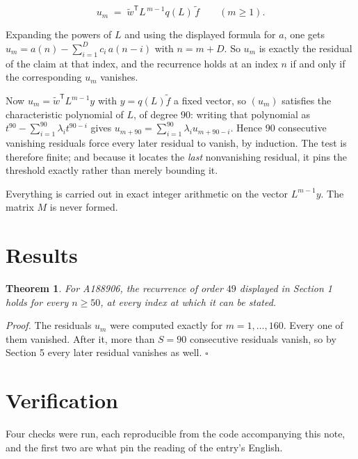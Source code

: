 \documentclass[11pt]{article}
\newtheorem{theorem}{Theorem}
\theoremstyle{definition}
\begin{document}
\[u_m \;=\; \tilde w^{\mathsf T} L^{\,m-1} q(L)\,\tilde f \qquad (m \ge 1).\]

Expanding the powers of $L$ and using the displayed formula for $a$, one gets $u_m = a(n) - \sum_{i=1}^{D} c_i\,a(n-i)$ with $n = m + D$. So $u_m$ is exactly the residual of the claim at that index, and the recurrence holds at an index $n$ if and only if the corresponding $u_m$ vanishes.

Now $u_m = \tilde w^{\mathsf T} L^{m-1} y$ with $y = q(L)\tilde f$ a fixed vector, so $(u_m)$ satisfies the characteristic polynomial of $L$, of degree $90$: writing that polynomial as $t^{90} - \sum_{i=1}^{90} \lambda_i t^{90-i}$ gives $u_{m+90} = \sum_{i=1}^{90} \lambda_i u_{m+90-i}$. Hence $90$ consecutive vanishing residuals force every later residual to vanish, by induction. The test is therefore finite; and because it locates the {\itshape last} nonvanishing residual, it pins the threshold exactly rather than merely bounding it.

Everything is carried out in exact integer arithmetic on the vector $L^{m-1}y$. The matrix $M$ is never formed.

\section{Results}

\begin{theorem} For A188906, the recurrence of order $49$ displayed in Section 1 holds for every $n \ge 50$, at every index at which it can be stated.\end{theorem}

{\itshape Proof.} The residuals $u_m$ were computed exactly for $m = 1,\dots,160$. Every one of them vanished. After it, more than $S = 90$ consecutive residuals vanish, so by Section 5 every later residual vanishes as well. $\square$

\section{Verification}

Four checks were run, each reproducible from the code accompanying this note, and the first two are what pin the reading of the entry's English.
\end{document}
